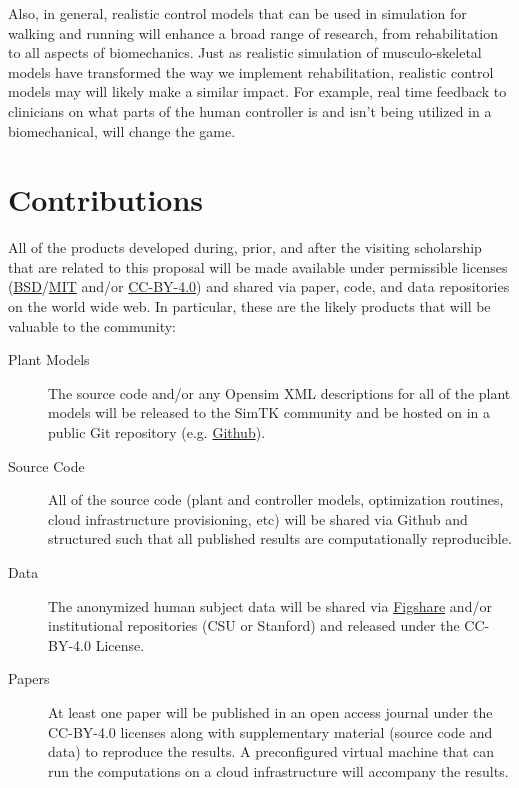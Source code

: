 \documentclass[11pt,twocolumn]{article}
\begin{document}
Also, in general, realistic control models that can be used in simulation for
walking and running will enhance a broad range of research, from rehabilitation
to all aspects of biomechanics. Just as realistic simulation of
musculo-skeletal models have transformed the way we implement rehabilitation,
realistic control models may will likely make a similar impact. For example,
real time feedback to clinicians on what parts of the human controller is and
isn't being utilized in a biomechanical, will change the game.

\section*{Contributions}

All of the products developed during, prior, and after the visiting scholarship
that are related to this proposal will be made available under permissible
licenses
(\href{http://opensource.org/licenses/BSD-2-Clause}{BSD}/\href{http://opensource.org/licenses/MIT}{MIT}
and/or \href{http://creativecommons.org/licenses/by/4.0/}{CC-BY-4.0}) and
shared via paper, code, and data repositories on the world wide web. In
particular, these are the likely products that will be valuable to the
community:

\begin{description}
  \item[Plant Models] The source code and/or any Opensim XML descriptions for
    all of the plant models will be released to the SimTK community and be
    hosted on in a public Git repository (e.g.
    \href{http://github.com}{Github}).
  \item[Source Code] All of the source code (plant and controller models,
    optimization routines, cloud infrastructure provisioning, etc) will be
    shared via Github and structured such that all published results are
    computationally reproducible.
  \item[Data] The anonymized human subject data will be shared via
    \href{http://figshare.com}{Figshare} and/or institutional repositories (CSU
    or Stanford) and released under the CC-BY-4.0 License.
  \item[Papers] At least one paper will be published in an open access journal
    under the CC-BY-4.0 licenses along with supplementary material (source code
    and data) to reproduce the results. A preconfigured virtual machine that
    can run the computations on a cloud infrastructure will accompany the
    results.
\end{description}
\end{document}
